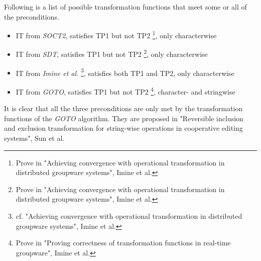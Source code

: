Following is a list of possible transformation functions that meet some or all of the preconditions.
\begin{itemize}
 \item IT from \emph{SOCT2}, satisfies TP1 but not TP2 \footnote{Prove in "Achieving convergence with operational transformation in distributed groupware systems", Imine et al.}, only characterwise
 \item IT from \emph{SDT}, satisfies TP1 but not TP2 \footnote{Prove in "Achieving convergence with operational transformation in distributed groupware systems", Imine et al.}, only characterwise
 \item IT from \emph{Imine et al.} \footnote{cf. "Achieving convergence with operational transformation in distributed groupware systems", Imine et al.}, satisfies both TP1 and TP2, only characterwise
 \item IT from \emph{GOTO}, satisfies TP1 but not TP2 \footnote{Prove in "Proving correctness of transformation functions in real-time groupware", Imine et al.}, character- and stringwise
 \end{itemize}

It is clear that all the three preconditions are only met by the transformation functions of the \emph{GOTO} algorithm. They are proposed in "Reversible inclusion and exclusion transformation for string-wise operations in  cooperative editing systems", Sun et al.
